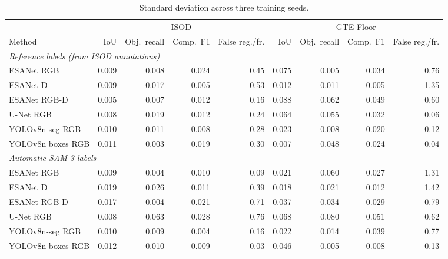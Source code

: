 \begin{table}[H]
\caption{Standard deviation across three training seeds.}
\label{tab:full-scores}
\centering\footnotesize
\setlength{\tabcolsep}{3.5pt}
\begin{tabular}{lrrrrrrrr}
\toprule
 & \multicolumn{4}{c}{ISOD} & \multicolumn{4}{c}{GTE-Floor}\\
\cmidrule(lr){2-5}\cmidrule(lr){6-9}
Method & IoU & Obj.\ recall & Comp.\ F1 & False reg./fr. & IoU & Obj.\ recall & Comp.\ F1 & False reg./fr.\\
\midrule
\multicolumn{9}{l}{\emph{Reference labels (from ISOD annotations)}}\\
ESANet RGB & 0.009 & 0.008 & 0.024 & 0.45 & 0.075 & 0.005 & 0.034 & 0.76\\
ESANet D & 0.009 & 0.017 & 0.005 & 0.53 & 0.012 & 0.011 & 0.005 & 1.35\\
ESANet RGB-D & 0.005 & 0.007 & 0.012 & 0.16 & 0.088 & 0.062 & 0.049 & 0.60\\
U-Net RGB & 0.008 & 0.019 & 0.012 & 0.24 & 0.064 & 0.055 & 0.032 & 0.06\\
YOLOv8n-seg RGB & 0.010 & 0.011 & 0.008 & 0.28 & 0.023 & 0.008 & 0.020 & 0.12\\
YOLOv8n boxes RGB & 0.011 & 0.003 & 0.019 & 0.30 & 0.007 & 0.048 & 0.024 & 0.04\\
\midrule
\multicolumn{9}{l}{\emph{Automatic SAM 3 labels}}\\
ESANet RGB & 0.009 & 0.004 & 0.010 & 0.09 & 0.021 & 0.060 & 0.027 & 1.31\\
ESANet D & 0.019 & 0.026 & 0.011 & 0.39 & 0.018 & 0.021 & 0.012 & 1.42\\
ESANet RGB-D & 0.017 & 0.004 & 0.021 & 0.71 & 0.037 & 0.034 & 0.029 & 0.79\\
U-Net RGB & 0.008 & 0.063 & 0.028 & 0.76 & 0.068 & 0.080 & 0.051 & 0.62\\
YOLOv8n-seg RGB & 0.010 & 0.009 & 0.004 & 0.16 & 0.022 & 0.014 & 0.039 & 0.77\\
YOLOv8n boxes RGB & 0.012 & 0.010 & 0.009 & 0.03 & 0.046 & 0.005 & 0.008 & 0.13\\
\bottomrule
\end{tabular}
\end{table}
